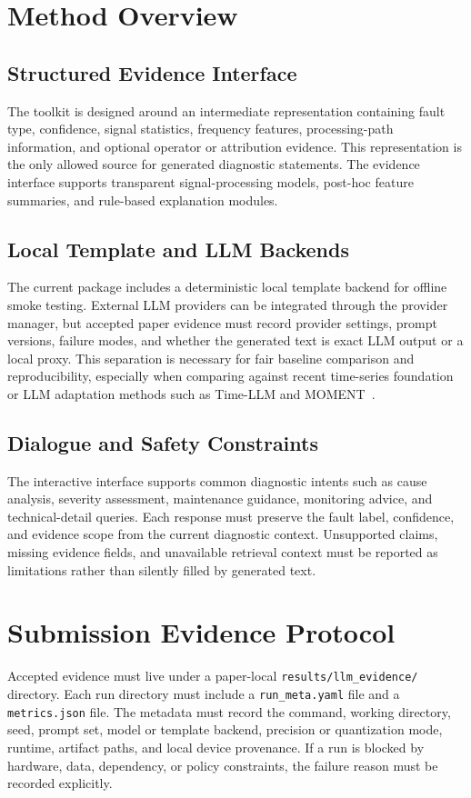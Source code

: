 \documentclass[journal]{IEEEtran}
\begin{document}
\section{Method Overview}
\subsection{Structured Evidence Interface}
The toolkit is designed around an intermediate representation containing fault
type, confidence, signal statistics, frequency features, processing-path
information, and optional operator or attribution evidence. This representation
is the only allowed source for generated diagnostic statements. The evidence
interface supports transparent signal-processing models, post-hoc feature
summaries, and rule-based explanation modules.

\subsection{Local Template and LLM Backends}
The current package includes a deterministic local template backend for
offline smoke testing. External LLM providers can be integrated through the
provider manager, but accepted paper evidence must record provider settings,
prompt versions, failure modes, and whether the generated text is exact LLM
output or a local proxy. This separation is necessary for fair baseline
comparison and reproducibility, especially when comparing against recent
time-series foundation or LLM adaptation methods such as Time-LLM and
MOMENT~\cite{jin2024timellm,goswami2024moment}.

\subsection{Dialogue and Safety Constraints}
The interactive interface supports common diagnostic intents such as cause
analysis, severity assessment, maintenance guidance, monitoring advice, and
technical-detail queries. Each response must preserve the fault label,
confidence, and evidence scope from the current diagnostic context. Unsupported
claims, missing evidence fields, and unavailable retrieval context must be
reported as limitations rather than silently filled by generated text.

\section{Submission Evidence Protocol}
Accepted evidence must live under a paper-local
\texttt{results/llm\_evidence/} directory. Each run directory must include a
\texttt{run\_meta.yaml} file and a \texttt{metrics.json} file. The metadata
must record the command, working directory, seed, prompt set, model or template
backend, precision or quantization mode, runtime, artifact paths, and local
device provenance. If a run is blocked by hardware, data, dependency, or policy
constraints, the failure reason must be recorded explicitly.
\end{document}
